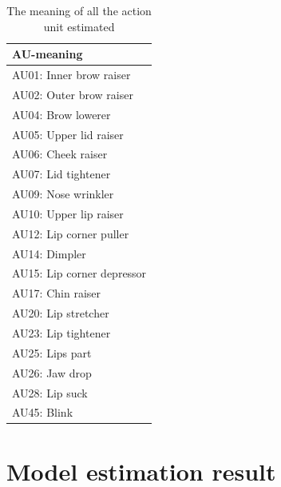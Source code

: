 \documentclass{monashthesis}
\begin{document}
\begin{table}[ht]
\begin{center}
\caption{\label{tab:au_meaning} The meaning of all the action unit estimated}
\begin{tabular}{l}
\toprule
AU-meaning \\
\midrule
AU01: Inner brow raiser \\
AU02: Outer brow raiser \\
AU04: Brow lowerer \\
AU05: Upper lid raiser \\
AU06: Cheek raiser \\
AU07: Lid tightener \\
AU09: Nose wrinkler \\
AU10: Upper lip raiser \\
AU12: Lip corner puller \\
AU14: Dimpler \\
AU15: Lip corner depressor \\
AU17: Chin raiser \\
AU20: Lip stretcher \\
AU23: Lip tightener \\
AU25: Lips part \\
AU26: Jaw drop \\
AU28: Lip suck \\
AU45: Blink \\
\bottomrule
\end{tabular}
\end{center}
\end{table}

\hypertarget{model-estimation-result}{%
\section{Model estimation result}\label{model-estimation-result}}
\end{document}
